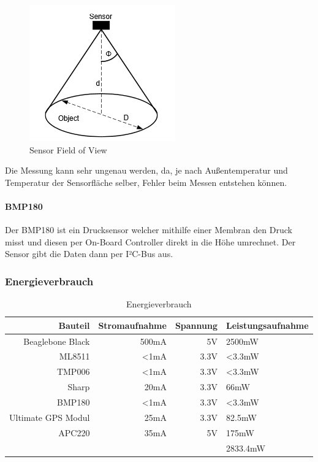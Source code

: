 \begin{figure}[h]
	\centering
	\includegraphics[scale=0.5]{2_Beschreibung_des_CANSAT/sensor_fov.png}
	\caption{Sensor Field of View}
	\label{sensor fov}
\end{figure}

Die Messung kann sehr ungenau werden, da, je nach Außentemperatur und Temperatur der Sensorfläche selber, Fehler beim Messen entstehen können.

\paragraph{BMP180}
Der BMP180 ist ein Drucksensor welcher mithilfe einer Membran den Druck misst und diesen per On-Board Controller direkt in die Höhe umrechnet. Der Sensor gibt die Daten dann per I²C-Bus aus.

\subsubsection{Energieverbrauch}
\begin{table}[H]
  \centering
    \begin{tabular}{rrrl}
    \toprule
    \textbf{Bauteil} & \textbf{Stromaufnahme} & \textbf{Spannung} & \textbf{Leistungsaufnahme} \\
    \midrule
    Beaglebone Black  & 500mA & 5V & 2500mW \\
    ML8511& <1mA & 3.3V & <3.3mW \\
    TMP006& <1mA& 3.3V& <3.3mW \\
    Sharp& 20mA & 3.3V& 66mW\\
    BMP180& <1mA& 3.3V& <3.3mW \\
    Ultimate GPS Modul& 25mA&3.3V& 82.5mW \\
    APC220& 35mA & 5V & 175mW\\

    \bottomrule
     & & &2833.4mW \\
    \bottomrule
    \end{tabular}%
    \caption{Energieverbrauch}
  \label{tab:budgetausgaben}%
\end{table}%
